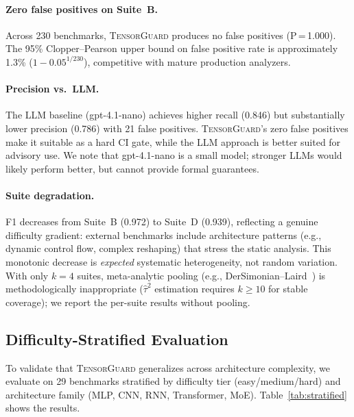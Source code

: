 \documentclass[11pt]{article}
\begin{document}
\paragraph{Zero false positives on Suite~B.}
Across 230 benchmarks, \textsc{TensorGuard} produces no false
positives (P\,=\,1.000).  The 95\% Clopper--Pearson upper bound
on false positive rate is approximately 1.3\% ($1 - 0.05^{1/230}$), competitive with
mature production analyzers.

\paragraph{Precision vs.\ LLM.}
The LLM baseline (gpt-4.1-nano) achieves higher recall (0.846)
but substantially lower precision (0.786) with 21 false positives.
\textsc{TensorGuard}'s zero false positives make it suitable as a
hard CI gate, while the LLM approach is better suited for advisory
use.  We note that gpt-4.1-nano is a small model; stronger LLMs
would likely perform better, but cannot provide formal guarantees.

\paragraph{Suite degradation.}
F1 decreases from Suite~B (0.972) to Suite~D (0.939), reflecting
a genuine difficulty gradient: external benchmarks include architecture
patterns (e.g., dynamic control flow, complex reshaping) that
stress the static analysis.  This monotonic decrease is \emph{expected}
systematic heterogeneity, not random variation.
With only $k=4$ suites, meta-analytic pooling (e.g.,
DerSimonian--Laird~\cite{dersimonian86}) is
methodologically inappropriate ($\hat{\tau}^2$ estimation requires
$k \geq 10$ for stable coverage); we report the per-suite results
without pooling.

\subsection{Difficulty-Stratified Evaluation}\label{sec:stratified}

To validate that \textsc{TensorGuard} generalizes across architecture
complexity, we evaluate on 29 benchmarks stratified by difficulty tier
(easy/medium/hard) and architecture family
(MLP, CNN, RNN, Transformer, MoE).
Table~\ref{tab:stratified} shows the results.
\end{document}
